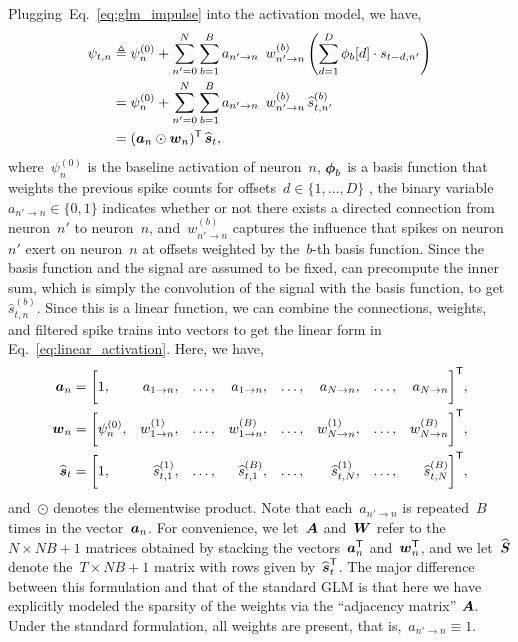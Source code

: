 Plugging~Eq.~\ref{eq:glm_impulse} into the activation model, we have,
\begin{align}
  \nonumber
  \psi_{t,n} &\triangleq \psi_n^{(0)}  +                 
               \sum_{n'=0}^N  \sum_{b=1}^B a_{n' \to n} \, w_{n' \to n}^{(b)}
               \left( \sum_{d=1}^{D} \phi_{b}[d] \cdot s_{t-d, n'} \right) \\
  \nonumber
             &= \psi_n^{(0)}  + \sum_{n'=0}^N \sum_{b=1}^B a_{n' \to n} \, w_{n' \to n}^{(b)} \, \widehat{s}_{t,n'}^{(b)} \\
  \label{eq:linear_activation}
             &= (\ba_{n} \odot \bw_n)^\trans \, \widehat{\bs}_t,
\end{align}
where~$\psi_n^{(0)}$ is the baseline activation of neuron~$n$,
$\boldsymbol{\phi}_{b}$ is a basis function 
that weights the previous spike counts for 
offsets~${d \in \{1, \ldots, D\}}$
, the binary variable~${a_{n' \to n} \in \{0,1\}}$ 
indicates whether or not there exists 
a directed connection from neuron~$n'$ to neuron~$n$,
and~$w_{n' \to n}^{(b)}$ captures the influence that
spikes on neuron~$n'$ exert on neuron~$n$ at
offsets weighted by the~$b$-th basis function.  
Since the basis function and the signal 
are assumed to be fixed,  can precompute the inner sum, which is simply the 
convolution of the signal with the basis function, to get~$\widehat{s}_{t,n}^{(b)}$.
Since this is a linear function, we can combine the
connections, weights, and filtered spike trains into
vectors to get the linear form  in Eq.~\ref{eq:linear_activation}.
Here, we have,
\begin{align*}
  \boldsymbol{a}_n &=
    \bigg[
      1,  
      & a_{1 \to n}, & & \ldots, & & a_{1 \to n}, 
      & & \ldots, &
      &a_{N \to n}, & & \ldots, & &a_{N \to n} 
    &\bigg]^{\mathsf{T}}, \\
  \boldsymbol{w}_n &=
    \bigg[
      \psi_n^{(0)}, 
      &w_{1 \to n}^{(1)}, & & \ldots, & &w_{1 \to n}^{(B)}, 
      & &\ldots, &
      &w_{N \to n}^{(1)}, & & \ldots, & &w_{N \to n}^{(B)} 
      &\bigg]^{\mathsf{T}}, \\
  \widehat{\boldsymbol{s}}_t &=
    \bigg[
      1, 
      &\widehat{s}_{t,1}^{(1)}, & & \ldots, & &\widehat{s}_{t,1}^{(B)}, 
      & &\ldots, &
      &\widehat{s}_{t,N}^{(1)}, & & \ldots, & &\widehat{s}_{t,N}^{(B)} 
    &\bigg]^{\mathsf{T}},
\end{align*}
\sloppy
and~$\odot$ denotes the elementwise product. Note that each~$a_{n' \to n}$ 
is repeated~$B$ times in the vector~$\boldsymbol{a}_{n}$. For convenience, we
let~$\boldsymbol{A}$ and~$\boldsymbol{W}$ refer to the~${N \times NB+1}$ matrices obtained
by stacking the vectors~$\boldsymbol{a}_n^{\mathsf{T}}$ and~$\boldsymbol{w}_n^{\mathsf{T}}$, and we
let~$\widehat{\boldsymbol{S}}$ denote the~${T \times NB+1}$ matrix with rows
given by~$\widehat{\boldsymbol{s}}_t^{\mathsf{T}}$. The major difference between this formulation and that of the standard 
GLM is that here we have explicitly modeled the sparsity of the 
weights via the ``adjacency matrix'' $\boldsymbol{A}$. Under the standard 
formulation, all weights are present, that is,~${a_{n' \to n} \equiv 1}$.

